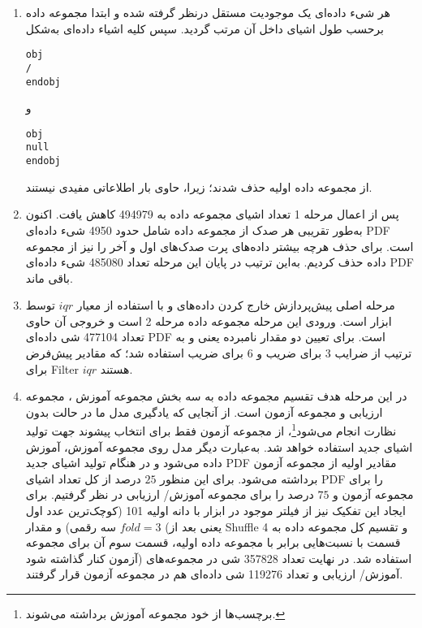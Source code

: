  \begin{enumerate}
 	\item {
 هر شیء داده‌ای یک موجودیت مستقل درنظر گرفته شده و ابتدا مجموعه داده برحسب طول اشیای داخل آن مرتب گردید. سپس کلیه اشیاء داده‌ای به‌شکل 
 \begin{LTR}
 	 \texttt{obj\\/\\endobj}
 \end{LTR}
و
 \begin{LTR}
	\texttt{obj\\null\\endobj}
\end{LTR}
از مجموعه داده اولیه حذف شدند؛ زیرا، حاوی بار اطلاعاتی مفیدی نیستند.
 
}

\item {
	پس از اعمال مرحله 1 تعداد اشیای مجموعه داده به 494979 کاهش یافت. اکنون به‌طور تقریبی هر صدک از مجموعه داده شامل حدود 4950 شیء داده‌ای  \gls{PDF} است. برای حذف هرچه بیشتر داده‌های پرت صدک‌های اول و آخر را نیز از مجموعه داده حذف کردیم. به‌این ترتیب در پایان این مرحله تعداد 485080  شیء داده‌ای  \gls{PDF} باقی‌ ماند.
	
}

\item {
	مرحله اصلی پیش‌پردازش خارج کردن داده‌های
	  و 
	  با استفاده از معیار $iqr$ توسط ابزار
	 \cite{Hall:2009:WDM:1656274.1656278}
	است. ورودی این مرحله مجموعه داده مرحله 2 است و خروجی آن حاوی تعداد 477104 شی‌ داده‌ای \gls{PDF} است. برای تعیین دو مقدار نامبرده یعنی
	  و 
	 به ترتیب از ضرایب 3 برای ضریب  و 6 برای ضریب
	  استفاده شد؛ که مقادیر پیش‌فرض 
	 برای \gls{Filter}
	  $iqr$ 
	   هستند.	
}

\item{
	در این مرحله هدف تقسیم مجموعه داده به سه بخش مجموعه آموزش ، مجموعه ارزیابی  و مجموعه آزمون  است. از آنجایی که یادگیری مدل ما در حالت بدون ‌نظارت انجام می‌شود\footnote{برچسب‌ها از خود مجموعه آموزش برداشته می‌شوند. }، از مجموعه آزمون فقط برای انتخاب پیشوند جهت تولید اشیای جدید استفاده خواهد شد. به‌عبارت دیگر مدل روی مجموعه آموزش، آموزش داده می‌شود و در هنگام تولید اشیای جدید \gls{PDF} مقادیر اولیه از مجموعه آزمون برداشته می‌شود. برای این منظور $25$ درصد از کل تعداد اشیای \gls{PDF} را برای مجموعه آزمون و $75$ درصد را برای مجموعه آموزش/ ارزیابی در نظر گرفتیم. برای ایجاد این تفکیک نیز از فیلتر 
	موجود در ابزار
	با دانه اولیه 101  (کوچک‌ترین عدد اول سه رقمی) و مقدار $ fold=3 $ (یعنی بعد از \gls{Shuffle} و تقسیم کل مجموعه داده به 4 قسمت با نسبت‌هایی برابر با مجموعه داده اولیه، قسمت سوم آن برای مجموعه آزمون کنار گذاشته شود) استفاده شد. در نهایت تعداد 357828 شی در مجموعه‌های آموزش/ ارزیابی و تعداد 119276 شی داده‌ای هم در مجموعه آزمون قرار گرفتند. 

}
\end{enumerate}
